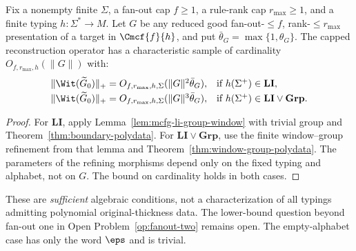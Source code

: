 \begin{corollary}
\label{cor:mcfg-li-group-polydata}
Fix a nonempty finite $\Sigma$, a fan-out cap $f\ge1$,
a rule-rank cap $r_{\max}\ge1$, and a finite typing
$h:\Sigma^*\to M$.
Let $G$ be any reduced good fan-out-$\le f$,
rank-$\le r_{\max}$ presentation of a target in $\Cmcf{f}{h}$,
and put $\bar\theta_G=\max\{1,\theta_G\}$.
The capped reconstruction operator has a characteristic sample
of cardinality $O_{f,r_{\max},h}(\|G\|)$ with:
\[
\begin{array}{ll}
 \|\Wit(\widetilde G_0)\|_+
 =O_{f,r_{\max},h,\Sigma}(\|G\|^2\bar\theta_G),
 &\text{if }h(\Sigma^+)\in\mathbf{LI},\\[2pt]
 \|\Wit(\widetilde G_0)\|_+
 =O_{f,r_{\max},h,\Sigma}(\|G\|^3\bar\theta_G),
 &\text{if }h(\Sigma^+)\in\mathbf{LI}\vee\mathbf{Grp}.
\end{array}
\]
\end{corollary}
\begin{proof}
For $\mathbf{LI}$, apply Lemma~\ref{lem:mcfg-li-group-window}
with trivial group and Theorem~\ref{thm:boundary-polydata}.
For $\mathbf{LI}\vee\mathbf{Grp}$, use the finite window--group
refinement from that lemma and
Theorem~\ref{thm:window-group-polydata}.
The parameters of the refining morphisms depend only on the fixed
typing and alphabet, not on $G$.  The bound on cardinality
holds in both cases.
\end{proof}

\begin{remark}
These are \emph{sufficient} algebraic conditions, not a
characterization of all typings admitting polynomial
original-thickness data.  The lower-bound question beyond
fan-out one in Open Problem~\ref{op:fanout-two} remains open.
The empty-alphabet case has only the word $\eps$ and is trivial.
\end{remark}

